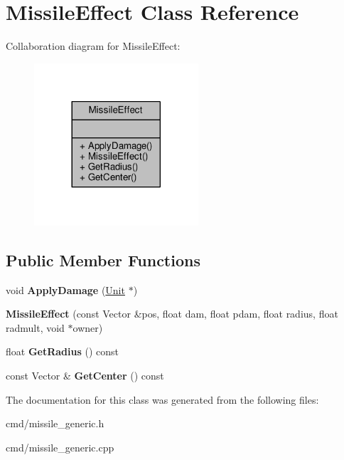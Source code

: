 \hypertarget{classMissileEffect}{}\section{Missile\+Effect Class Reference}
\label{classMissileEffect}


Collaboration diagram for Missile\+Effect\+:
\nopagebreak
\begin{figure}[H]
\begin{center}
\leavevmode
\includegraphics[width=173pt]{dd/dea/classMissileEffect__coll__graph}
\end{center}
\end{figure}
\subsection*{Public Member Functions}
\begin{DoxyCompactItemize}
\item 
void {\bfseries Apply\+Damage} (\hyperlink{classUnit}{Unit} $\ast$)\hypertarget{classMissileEffect_a33c40940889e7628b549ab2d1f259b64}{}\label{classMissileEffect_a33c40940889e7628b549ab2d1f259b64}

\item 
{\bfseries Missile\+Effect} (const Vector \&pos, float dam, float pdam, float radius, float radmult, void $\ast$owner)\hypertarget{classMissileEffect_ac6465cee5f5e8da37767c00bf99d9d05}{}\label{classMissileEffect_ac6465cee5f5e8da37767c00bf99d9d05}

\item 
float {\bfseries Get\+Radius} () const \hypertarget{classMissileEffect_a026b1e8f6716c9689f9d318cfc392b15}{}\label{classMissileEffect_a026b1e8f6716c9689f9d318cfc392b15}

\item 
const Vector \& {\bfseries Get\+Center} () const \hypertarget{classMissileEffect_a91cbfc3ce5d80c90a81eabc88f4554f8}{}\label{classMissileEffect_a91cbfc3ce5d80c90a81eabc88f4554f8}

\end{DoxyCompactItemize}


The documentation for this class was generated from the following files\+:\begin{DoxyCompactItemize}
\item 
cmd/missile\+\_\+generic.\+h\item 
cmd/missile\+\_\+generic.\+cpp\end{DoxyCompactItemize}
